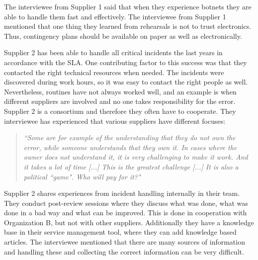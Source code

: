 \documentclass[b5paper, twoside, openright, 11pt]{report}
\begin{document}
The interviewee from Supplier 1 said that when they experience botnets they are able to handle them fast and effectively. The interviewee from Supplier 1 mentioned that one thing they learned from rehearsals is not to trust electronics. Thus, contingency plans should be available on paper as well as electronically.

Supplier 2 has been able to handle all critical incidents the last years in accordance with the \ac{SLA}. One contributing factor to this success was that they contacted the right technical resources when needed. The incidents were discovered during work hours, so it was easy to contact the right people as well. Nevertheless, routines have not always worked well, and an example is when different suppliers are involved and no one takes responsibility for the error. Supplier 2 is a consortium and therefore they often have to cooperate. They interviewee has experienced that various suppliers have different focuses:

\begin{quote}
\textit{``Some are for example of the understanding that they do not own the error, while someone understands that they own it. In cases where the owner does not understand it, it is very challenging to make it work. And it takes a lot of time [...] This is the greatest challenge [...] It is also a political ``game". Who will pay for it?"}
\end{quote}

Supplier 2 shares experiences from incident handling internally in their team. They conduct post-review sessions where they discuss what was done, what was done in a bad way and what can be improved. This is done in cooperation with Organization B, but not with other suppliers. Additionally they have a knowledge base in their service management tool, where they can add knowledge based articles. The interviewee mentioned that there are many sources of information and handling these and collecting the correct information can be very difficult.
\end{document}
